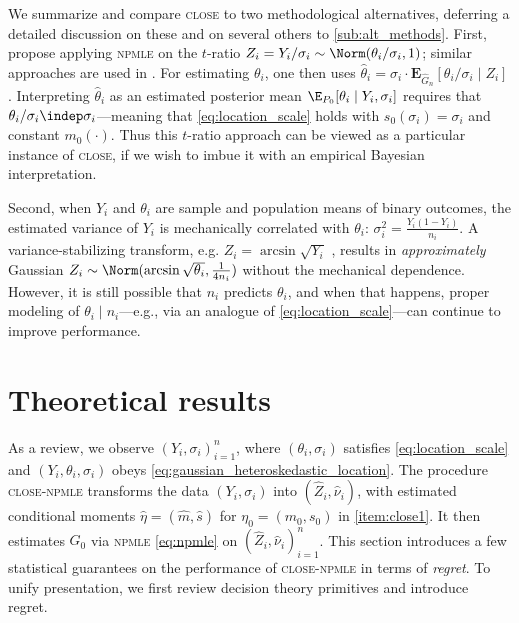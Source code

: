 \documentclass[12pt, reqno]{amsart}
\newcommand{\hatm}{\hat m}
\newcommand{\hats}{\hat s}
\newcommand{\hateta}{\hat\eta}
\newcommand{\PE}{\mathbf{E}}
\newcommand{\close}{\textsc{close}}
\newcommand{\npmle}{\textsc{npmle}}
\newcommand{\closenpmle}{\close-\npmle}
\numberwithin{equation}{section}
\begin{document}
\begin{rmksq}
\label{rmk:alts_to_close} We summarize and compare \close{} to two methodological
 alternatives, deferring a detailed discussion on these and on several others to
 \cref{sub:alt_methods}. First, \citet{jiang2010empirical} propose applying \npmle{} on
 the $t$-ratio $Z_i = Y_i / \sigma_i \sim \Norm(\theta_i/\sigma_i, 1)$; similar approaches
 are used in \citet{efron2016empirical,kline2022systemic}. For estimating $\theta_i$, one
 then uses $\hat\theta_i =
 \sigma_i \cdot \PE_{\hat G_n}[\theta_i/\sigma_i \mid Z_i]$. Interpreting $\hat\theta_i$
  as an estimated posterior mean $\E_{P_0}[\theta_i \mid Y_i, \sigma_i]$ requires that
  $\theta_i / \sigma_i \indep \sigma_i$---meaning that \eqref{eq:location_scale} holds
  with $s_0(\sigma_i) = \sigma_i$ and constant $m_0(\cdot)$. Thus this $t$-ratio approach
  can be viewed as a particular instance of \close, if we wish to imbue it with an
  empirical Bayesian interpretation.

Second, when $Y_i$ and $\theta_i$ are sample and population means of binary outcomes, the
estimated variance of $Y_i$ is mechanically correlated with $\theta_i$: $\sigma_i^2 = 
\frac{Y_i (1-Y_i)}
{n_i}.$ A variance-stabilizing transform, e.g. $Z_i = \arcsin\sqrt{Y_i}$
\citep{10.1214/07-AOAS138}, results in \emph{approximately} Gaussian $Z_i \sim \Norm(\arcsin{
\sqrt{\theta_i}}, \frac{1}{4n_i})$ without the mechanical dependence. However, it is still
 possible that $n_i$ predicts $\theta_i$, and when that happens, proper modeling of
 $\theta_i \mid n_i$---e.g., via an analogue of \eqref{eq:location_scale}---can continue
 to improve performance.
\end{rmksq}













\section{Theoretical results}
\label{sec:regret}

As a review, we observe $(Y_i, \sigma_i)_{i=1}^n$, where $(\theta_i,\sigma_i)$ satisfies
\eqref{eq:location_scale} and $(Y_i, \theta_i, \sigma_i)$ obeys
\eqref{eq:gaussian_heteroskedastic_location}. The procedure
\closenpmle{} transforms the data $(Y_i, \sigma_i)$ into $(\hat Z_i, \hat \nu_i)$, with
 estimated conditional moments $\hateta = (\hatm, \hats)$ for $\eta_0 = (m_0, s_0)$ in
 \cref{item:close1}. It then estimates $G_0$ via \npmle{}
\eqref{eq:npmle} on $(\hat Z_i, \hat \nu_i)_{i=1}^n$. This section introduces a few
 statistical guarantees on the performance of \closenpmle{} in terms of \emph{regret}. To
 unify presentation, we first review decision theory primitives and introduce regret. 
\end{document}
